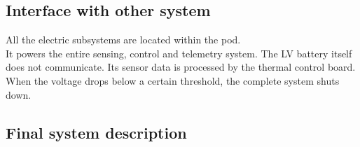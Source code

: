 \subsection{Interface with other system}
All the electric subsystems are located within the pod. \\
It powers the entire sensing, control and telemetry system. 
The LV battery itself does not communicate. Its sensor data is processed by the thermal control board.
When the voltage drops below a certain threshold, the complete system shuts down.

\subsection{Final system description}

